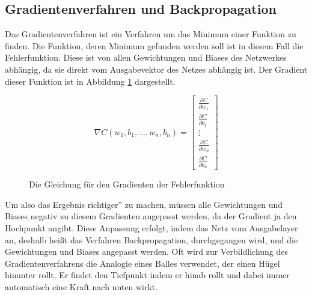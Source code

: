 \documentclass{article}
\begin{document}
\subsection{Gradientenverfahren und Backpropagation}
\label{Gradient_section}
Das Gradientenverfahren ist ein Verfahren um das Minimum einer Funktion zu finden. Die Funktion, deren Minimum gefunden werden soll ist in diesem Fall die Fehlerfunktion. Diese ist von allen Gewichtungen und Biases des Netzwerkes abhängig, da sie direkt vom Ausgabevektor des Netzes abhängig ist. Der Gradient dieser Funktion ist in Abbildung \ref{Gradient_Function} dargestellt.
\begin{figure}[h]
	\begin{equation*}
	\nabla C(w_1,b_1,\ldots,w_n,b_n)=
	\begin{bmatrix}
		\frac{\partial C}{\partial w_1}\\
		\frac{\partial C}{\partial b_1}\\
		\vdots\\
		\frac{\partial C}{\partial w_n}\\
		\frac{\partial C}{\partial b_n}
	\end{bmatrix}
	\end{equation*}
	\caption{Die Gleichung für den Gradienten der Fehlerfunktion}
	\label{Gradient_Function}
\end{figure}
\newline
Um also das Ergebnis \glqq richtiger'' zu machen, müssen alle Gewichtungen und Biases negativ zu diesem Gradienten angepasst werden, da der Gradient ja den Hochpunkt angibt. Diese Anpassung erfolgt, indem das Netz vom Ausgabelayer an, deshalb heißt das Verfahren Backpropagation, durchgegangen wird, und die Gewichtungen und Biases angepasst werden.\newline
Oft wird zur Verbildlichung des Gradientenverfahrens die Analogie eines Balles verwendet, der einen Hügel hinunter rollt. Er findet den Tiefpunkt indem er hinab rollt und dabei immer automatisch eine Kraft nach unten wirkt.
\end{document}
